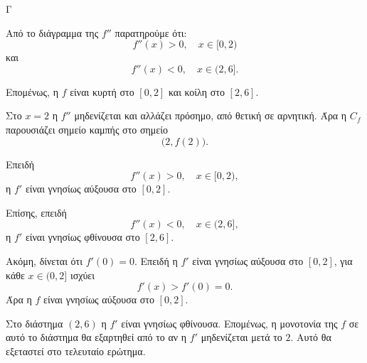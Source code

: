 
\begin{thema}{Γ}

\begin{center}
\end{center}

\begin{erwthma}
\item Από το διάγραμμα της $f''$ παρατηρούμε ότι:
\[
f''(x)>0,\quad x\in[0,2)
\]
και
\[
f''(x)<0,\quad x\in(2,6].
\]

Επομένως, η $f$ είναι κυρτή στο $[0,2]$ και κοίλη στο $[2,6]$.

Στο $x=2$ η $f''$ μηδενίζεται και αλλάζει πρόσημο, από θετική σε αρνητική.
Άρα η $C_f$ παρουσιάζει σημείο καμπής στο σημείο
\[
\bigl(2,f(2)\bigr).
\]

\item Επειδή
\[
f''(x)>0,\quad x\in[0,2),
\]
η $f'$ είναι γνησίως αύξουσα στο $[0,2]$.

Επίσης, επειδή
\[
f''(x)<0,\quad x\in(2,6],
\]
η $f'$ είναι γνησίως φθίνουσα στο $[2,6]$.

Ακόμη, δίνεται ότι $f'(0)=0$. Επειδή η $f'$ είναι γνησίως αύξουσα στο $[0,2]$, για κάθε $x\in(0,2]$ ισχύει
\[
f'(x)>f'(0)=0.
\]
Άρα η $f$ είναι γνησίως αύξουσα στο $[0,2]$.

Στο διάστημα $(2,6)$ η $f'$ είναι γνησίως φθίνουσα. Επομένως, η μονοτονία της $f$ σε αυτό το διάστημα θα εξαρτηθεί από το αν η $f'$ μηδενίζεται μετά το $2$. Αυτό θα εξεταστεί στο τελευταίο ερώτημα.


\end{erwthma}
\end{thema}
